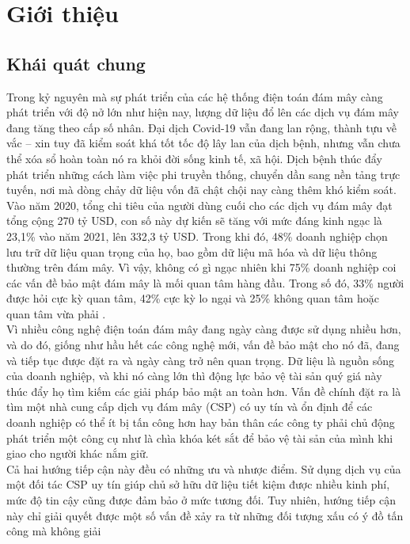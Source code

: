 \chapter{Giới thiệu}
\section{Khái quát chung}

Trong kỷ nguyên mà sự phát triển của các hệ thống điện toán đám mây càng phát
triển với độ nở lớn như hiện nay, lượng dữ liệu đổ lên các dịch vụ đám mây đang tăng
theo cấp số nhân. Đại dịch Covid-19 vẫn đang lan rộng, thành tựu về vắc – xin tuy đã
kiểm soát khá tốt tốc độ lây lan của dịch bệnh, nhưng vẫn chưa thể xóa sổ hoàn toàn nó
ra khỏi đời sống kinh tế, xã hội. Dịch bệnh thúc đẩy phát triển những cách làm việc phi
truyền thống, chuyển dần sang nền tảng trực tuyến, nơi mà dòng chảy dữ liệu vốn đã
chật chội nay càng thêm khó kiểm soát. Vào năm 2020, tổng chi tiêu của người dùng
cuối cho các dịch vụ đám mây đạt tổng cộng 270 tỷ USD, con số này dự kiến sẽ tăng với
mức đáng kinh ngạc là 23,1\% vào năm 2021, lên 332,3 tỷ USD. Trong khi đó, 48\%
doanh nghiệp chọn lưu trữ dữ liệu quan trọng của họ, bao gồm dữ liệu mã hóa và dữ liệu
thông thường trên đám mây. Vì vậy, không có gì ngạc nhiên khi 75\% doanh nghiệp coi
các vấn đề bảo mật đám mây là mối quan tâm hàng đầu. Trong số đó, 33\% người được
hỏi cực kỳ quan tâm, 42\% cực kỳ lo ngại và 25\% không quan tâm hoặc quan tâm vừa
phải \cite{vladimir2021cloudcomputing}. \\
\indent Vì nhiều công nghệ điện toán đám mây đang ngày càng được sử dụng nhiều hơn,
và do đó, giống như hầu hết các công nghệ mới, vấn đề bảo mật cho nó đã, đang và tiếp
tục được đặt ra và ngày càng trở nên quan trọng. Dữ liệu là nguồn sống của doanh nghiệp,
và khi nó càng lớn thì động lực bảo vệ tài sản quý giá này thúc đẩy họ tìm kiếm các giải
pháp bảo mật an toàn hơn. Vấn đề chính đặt ra là tìm một nhà cung cấp dịch vụ đám mây
(CSP) có uy tín và ổn định để các doanh nghiệp có thể ít bị tấn công hơn hay bản thân
các công ty phải chủ động phát triển một công cụ như là chìa khóa két sắt để bảo vệ tài
sản của mình khi giao cho người khác nắm giữ. \\
\indent Cả hai hướng tiếp cận này đều có những ưu và nhược điểm. Sử dụng dịch vụ của
một đối tác CSP uy tín giúp chủ sở hữu dữ liệu tiết kiệm được nhiều kinh phí, mức độ
tin cậy cũng được đảm bảo ở mức tương đối. Tuy nhiên, hướng tiếp cận này chỉ giải quyết được một số vấn đề xảy ra từ những đối tượng xấu có ý đồ tấn công mà không giải
